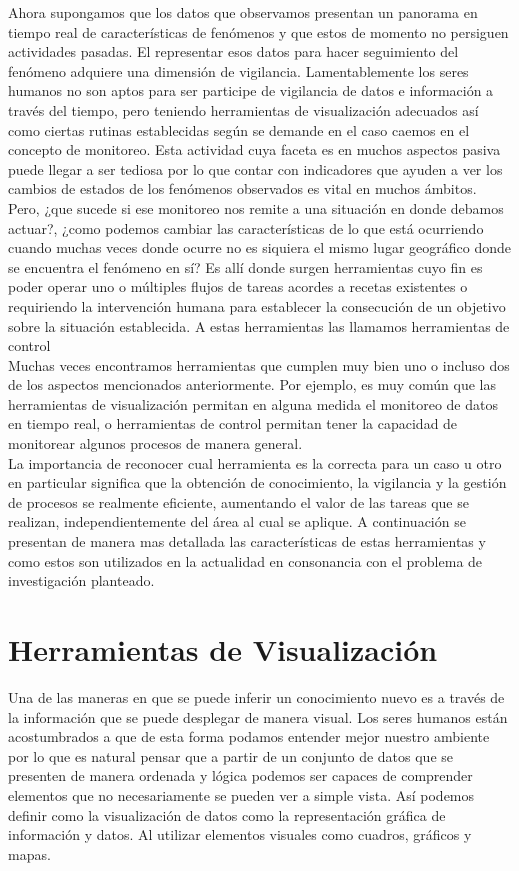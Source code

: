 Ahora supongamos que los datos que observamos presentan un panorama en tiempo real de características de fenómenos y que estos de momento no persiguen actividades pasadas. El representar esos datos para hacer seguimiento del fenómeno adquiere una dimensión de vigilancia. Lamentablemente los seres humanos no son aptos para ser participe de vigilancia de datos e información a través del tiempo, pero teniendo herramientas de visualización adecuados así como ciertas rutinas establecidas según se demande en el caso caemos en el concepto de monitoreo. Esta actividad cuya faceta es en muchos aspectos pasiva puede llegar a ser tediosa por lo que contar con indicadores que ayuden a ver los cambios de estados de los fenómenos observados es vital en muchos ámbitos.\\

Pero, ¿que sucede si ese monitoreo nos remite a una situación en donde debamos actuar?, ¿como podemos cambiar las características de lo que está ocurriendo cuando muchas veces donde ocurre no es siquiera el mismo lugar geográfico donde se encuentra el fenómeno en sí? Es allí donde surgen herramientas cuyo fin es poder operar uno o múltiples flujos de tareas acordes a recetas existentes o requiriendo la intervención humana para establecer la consecución de un objetivo sobre la situación establecida. A estas herramientas las llamamos herramientas de control\\

Muchas veces encontramos herramientas que cumplen muy bien uno o incluso dos de los aspectos mencionados anteriormente. Por ejemplo, es muy común que las herramientas de visualización permitan en alguna medida el monitoreo de datos en tiempo real, o herramientas de control permitan tener la capacidad de monitorear algunos procesos de manera general.\\

La importancia de reconocer cual herramienta es la correcta para un caso u otro en particular significa que la obtención de conocimiento, la vigilancia y la gestión de procesos se realmente eficiente, aumentando el valor de las tareas que se realizan, independientemente del área al cual se aplique. A continuación se presentan de manera mas detallada las características de estas herramientas y como estos son utilizados en la actualidad en consonancia con el problema de investigación planteado.

\section{Herramientas de Visualización}
Una de las maneras en que se puede inferir un conocimiento nuevo es a través de la información que se puede desplegar de manera visual. Los seres humanos están acostumbrados a que de esta forma podamos entender mejor nuestro ambiente por lo que es natural pensar que a partir de un conjunto de datos que se presenten de manera ordenada y lógica podemos ser capaces de comprender elementos que no necesariamente se pueden ver a simple vista. Así podemos definir como la visualización de datos como la  representación gráfica de información y datos. Al utilizar elementos visuales como cuadros, gráficos y mapas\cite{visualizaciondef}.\\

